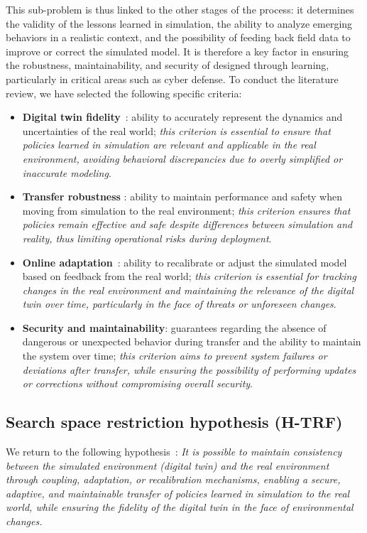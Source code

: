 This sub-problem is thus linked to the other stages of the process: it determines the validity of the lessons learned in simulation, the ability to analyze emerging behaviors in a realistic context, and the possibility of feeding back field data to improve or correct the simulated model. It is therefore a key factor in ensuring the robustness, maintainability, and security of  designed through learning, particularly in critical areas such as cyber defense.
To conduct the literature review, we have selected the following specific criteria:
%
\begin{itemize}
  \item \textbf{Digital twin fidelity}~: ability to accurately represent the dynamics and uncertainties of the real world; \emph{this criterion is essential to ensure that policies learned in simulation are relevant and applicable in the real environment, avoiding behavioral discrepancies due to overly simplified or inaccurate modeling}.
  \item \textbf{Transfer robustness} : ability to maintain performance and safety when moving from simulation to the real environment; \emph{this criterion ensures that policies remain effective and safe despite differences between simulation and reality, thus limiting operational risks during deployment}.
  \item \textbf{Online adaptation}~: ability to recalibrate or adjust the simulated model based on feedback from the real world; \emph{this criterion is essential for tracking changes in the real environment and maintaining the relevance of the digital twin over time, particularly in the face of threats or unforeseen changes}.
  \item \textbf{Security and maintainability}: guarantees regarding the absence of dangerous or unexpected behavior during transfer and the ability to maintain the system over time; \emph{this criterion aims to prevent system failures or deviations after transfer, while ensuring the possibility of performing updates or corrections without compromising overall security}.
\end{itemize}


\subsection*{Search space restriction hypothesis (\textbf{H-TRF})}

We return to the following hypothesis~: \textit{It is possible to maintain consistency between the simulated environment (digital twin) and the real environment through coupling, adaptation, or recalibration mechanisms, enabling a secure, adaptive, and maintainable transfer of policies learned in simulation to the real world, while ensuring the fidelity of the digital twin in the face of environmental changes.}

